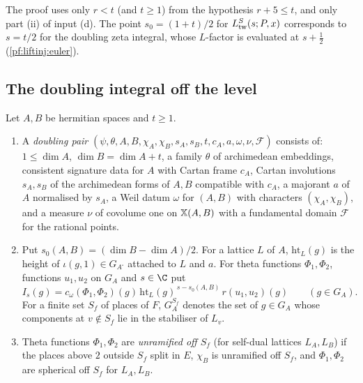 \begin{remark}\label{pf:liftinj:polerem}
The proof uses only $r<t$ (and $t\ge1$) from the hypothesis $r+5\le t$, and only part (ii) of input (d). The
point $s_0=(1+t)/2$ for $L^{S}_{\mathrm{tw}}(s;P,x)$ corresponds to $s=t/2$ for the doubling zeta integral, whose
$L$-factor is evaluated at $s+\frac12$ (\cref{pf:liftinj:euler}).
\end{remark}

\subsection{The doubling integral off the level}\label{sec:pf:liftinj:doubling}

\begin{definition}\label{pf:liftinj:ERdef}
Let $A,B$ be hermitian spaces and $t\ge1$.
\begin{enumerate}[label=(\alph*)]
\item A \emph{doubling pair} $(\psi,\theta,A,B,\chi_A,\chi_B,s_A,s_B,t,c_A,a,\omega,\nu,\mathcal F)$ consists of: $1\le\dim A$, $\dim B=\dim A+t$,
a family $\theta$ of archimedean embeddings, consistent signature data for $A$ with Cartan frame $c_A$, Cartan involutions $s_A,s_B$ of the
archimedean forms of $A,B$ compatible with $c_A$, a majorant $a$ of $A$ normalised by $s_A$, a Weil datum $\omega$ for $(A,B)$ with characters
$(\chi_A,\chi_B)$, and a measure $\nu$ of covolume one on $\mathbb{X}(A,B)$ with a fundamental domain $\mathcal F$ for the rational points.
\item Put $s_0(A,B)=(\dim B-\dim A)/2$. For a lattice $L$ of $A$, $\mathrm{ht}_L(g)$ is the height of $\iota(g,1)\in G_{A^\square}$ attached to $L$
and $a$. For theta functions $\Phi_1,\Phi_2$, functions $u_1,u_2$ on $G_A$ and $s\in\C$ put
\begin{equation}\label{eq:pf:liftinj:integrand}
I_s(g)=c_\omega(\Phi_1,\Phi_2)(g)\,\mathrm{ht}_L(g)^{\,s-s_0(A,B)}\,r(u_1,u_2)(g)\qquad(g\in G_A).
\end{equation}
For a finite set $S_f$ of places of $F$, $G_A^{S_f}$ denotes the set of $g\in G_A$ whose components at $v\notin S_f$ lie in the stabiliser of
$L_v$.
\item Theta functions $\Phi_1,\Phi_2$ are \emph{unramified off $S_f$} (for self-dual lattices $L_A,L_B$) if the places above $2$ outside
$S_f$ split in $E$, $\chi_B$ is unramified off $S_f$, and $\Phi_1,\Phi_2$ are spherical off $S_f$ for $L_A,L_B$.

\end{enumerate}
\end{definition}
